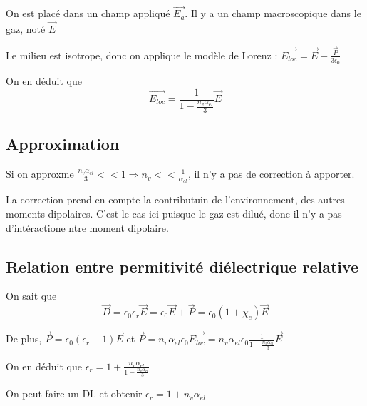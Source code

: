 \documentclass[french]{yLectureNote}
\renewcommand{\vec}{\overrightarrow}
\begin{document}
On est placé dans un champ appliqué $\vec{E_a}$. Il y a un champ macroscopique dans le gaz, noté $\vec{E}$

Le milieu est isotrope, donc on applique le modèle de Lorenz : $\vec{E_{loc}} = \vec{E} + \frac{\vec{P}}{3\epsilon_0}$

On en déduit que $$\vec{E_{loc}} = \frac{1}{1 - \frac{n_v \alpha_{el}}{3}} \vec{E}$$
\subsection{Approximation}
Si on approxme $\frac{n_v \alpha_{el}}{3}<<1\Rightarrow n_v << \frac{1}{\alpha_{el}}$, il n'y a pas de correction à apporter.

La correction prend en compte la contributuin de l'environnement, des autres moments dipolaires. C'est le cas ici puisque le gaz est dilué, donc il n'y a pas d'intéractione ntre moment dipolaire.
\subsection{Relation entre permitivité diélectrique relative }

On sait que $$\vec{D} = \epsilon_0\epsilon_r \vec{E} = \epsilon_0 \vec{E}+\vec{P} = \epsilon_0(1+\chi_e)\vec{E}$$

De plus, $\vec{P} = \epsilon_0 (\epsilon_r-1)\vec{E}$ et 
$\vec{P} = n_v \alpha_{el} \epsilon_0 \vec{E_{loc}} = n_v \alpha_{el} \epsilon_0 \frac{1}{1-\frac{n_v \alpha_{el}}{3}}\vec{E}$

On en déduit que $\epsilon_r = 1 + \frac{n_v \alpha_{el}}{1-\frac{n_v \alpha_{el}}{3}}$

On peut faire un DL et obtenir $\epsilon_r = 1+ n_v \alpha_{el}$
\end{document}
